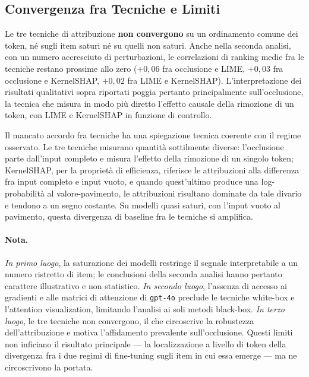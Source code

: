 \documentclass[pdflatex, sn-apa]{sn-jnl}%
\theoremstyle{thmstyleone}%
\theoremstyle{thmstyletwo}%
\theoremstyle{thmstylethree}%
\begin{document}
\subsection{Convergenza fra Tecniche e Limiti}
\label{sec:xai:limits}

Le tre tecniche di
attribuzione \textbf{non convergono} su un ordinamento comune dei token, né sugli
item saturi né su quelli non saturi. Anche nella seconda analisi, con un numero
accresciuto di perturbazioni, le correlazioni di ranking medie fra le tecniche
restano prossime allo zero ($+0{,}06$ fra occlusione e LIME, $+0{,}03$ fra
occlusione e KernelSHAP, $+0{,}02$ fra LIME e KernelSHAP). L'interpretazione dei
risultati qualitativi sopra riportati poggia pertanto principalmente
sull'occlusione, la tecnica che misura in modo più diretto l'effetto causale della
rimozione di un token, con LIME e KernelSHAP in funzione di controllo.

Il mancato accordo fra tecniche ha una spiegazione tecnica coerente con il regime
osservato. Le tre tecniche misurano quantità sottilmente diverse: l'occlusione
parte dall'input completo e misura l'effetto della rimozione di un singolo token;
KernelSHAP, per la proprietà di efficienza, riferisce le attribuzioni alla
differenza fra input completo e input vuoto, e quando quest'ultimo produce una
log-probabilità al valore-pavimento, le attribuzioni risultano dominate da tale
divario e tendono a un segno costante. Su modelli quasi saturi, con l'input vuoto
al pavimento, questa divergenza di baseline fra le tecniche si amplifica.

\paragraph{Nota.}
\emph{In primo luogo},
la saturazione dei modelli restringe il segnale interpretabile a un numero ristretto
di item; le conclusioni della seconda analisi hanno pertanto carattere illustrativo
e non statistico. \emph{In secondo luogo}, l'assenza di accesso ai gradienti e alle
matrici di attenzione di \texttt{gpt-4o} preclude le tecniche white-box e l'attention
visualization, limitando l'analisi ai soli metodi black-box. \emph{In terzo luogo},
le tre tecniche non convergono, il che circoscrive la robustezza dell'attribuzione e
motiva l'affidamento prevalente sull'occlusione. Questi limiti non inficiano il
risultato principale --- la localizzazione a livello di token della divergenza fra i
due regimi di fine-tuning sugli item in cui essa emerge --- ma ne circoscrivono la
portata.
\end{document}
